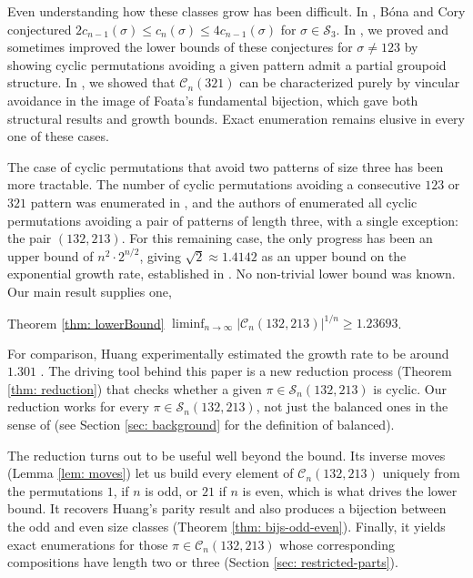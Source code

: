 \documentclass[11pt]{article}
\renewcommand\S{\mathcal S}
\newcommand\C{\mathcal C}
\theoremstyle{definition}
\newcommand{\thistheoremname}{}
\newtheorem*{genericthm*}{\thistheoremname}
\newenvironment{namedthm*}[1]
  {\renewcommand{\thistheoremname}{#1}%
   \begin{genericthm*}}
  {\end{genericthm*}}
\begin{document}
Even understanding how these classes grow has been difficult. In \cite[Conjecture 5.2]{BC19}, B\'ona and Cory conjectured $2c_{n-1}(\sigma) \leq c_n(\sigma) \leq 4 c_{n-1}(\sigma)$ for $\sigma \in \S_3$. In \cite{AGL25}, we proved and sometimes improved the lower bounds of these conjectures for $\sigma \not= 123$ by showing cyclic permutations avoiding a given pattern admit a partial groupoid structure. In \cite{La26}, we showed that $\C_n(321)$ can be characterized purely by vincular avoidance in the image of Foata's fundamental bijection, which gave both structural results and growth bounds. Exact enumeration remains elusive in every one of these cases.

The case of cyclic permutations that avoid two patterns of size three has been more tractable. The number of cyclic permutations avoiding a consecutive $123$ or $321$ pattern was enumerated in \cite{ET19}, and the authors of \cite{AE14, BC19} enumerated all cyclic permutations avoiding a pair of patterns of length three, with a single exception: the pair $(132,213)$. For this remaining case, the only progress has been an upper bound of $n^2 \cdot 2^{n/2}$, giving $\sqrt{2} \approx 1.4142$ as an upper bound on the exponential growth rate, established in \cite[Theorem 1.4]{H19}. No non-trivial lower bound was known. Our main result supplies one,

\begin{namedthm*}{Theorem \ref{thm: lowerBound}}
    $\liminf_{n \to \infty} |\C_{n}(132,213)|^{1/n} \geq  1.23693$.
\end{namedthm*}

For comparison, Huang experimentally estimated the growth rate to be around $1.301$ \cite[Section 5]{H19}. The driving tool behind this paper is a new reduction process (Theorem \ref{thm: reduction}) that checks whether a given $\pi \in \S_n(132,213)$ is cyclic. Our reduction works for every $\pi \in \S_n(132,213)$, not just the balanced ones in the sense of \cite{H19} (see Section \ref{sec: background} for the definition of balanced). 

The reduction turns out to be useful well beyond the bound. Its inverse moves (Lemma \ref{lem: moves}) let us build every element of $\C_n(132,213)$ uniquely from the permutations $1$, if $n$ is odd, or $21$ if $n$ is even, which is what drives the lower bound. It recovers Huang's parity result and also produces a bijection between the odd and even size classes (Theorem \ref{thm: bijs-odd-even}). Finally, it yields exact enumerations for those $\pi \in \C_n(132,213)$ whose corresponding compositions have length two or three (Section \ref{sec: restricted-parts}).
\end{document}
